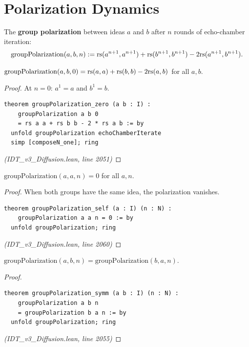 \section{Polarization Dynamics}

\begin{definition}
\label{def:group-polarization}
The \textbf{group polarization} between ideas $a$ and $b$ after $n$ rounds
of echo-chamber iteration:
\[
  \mathrm{groupPolarization}(a, b, n) := \mathrm{rs}(a^{n+1}, a^{n+1}) + \mathrm{rs}(b^{n+1}, b^{n+1}) - 2\mathrm{rs}(a^{n+1}, b^{n+1}).
\]
\end{definition}

\begin{theorem}
\label{thm:polarization-zero}
$\mathrm{groupPolarization}(a, b, 0) = \mathrm{rs}(a, a) + \mathrm{rs}(b, b) - 2\mathrm{rs}(a, b)$
for all $a, b$.
\end{theorem}

\begin{proof}
At $n = 0$: $a^1 = a$ and $b^1 = b$.
\begin{lstlisting}
theorem groupPolarization_zero (a b : I) :
    groupPolarization a b 0
    = rs a a + rs b b - 2 * rs a b := by
  unfold groupPolarization echoChamberIterate
  simp [composeN_one]; ring
\end{lstlisting}
\textit{(IDT\_v3\_Diffusion.lean, line 2051)}
\end{proof}

\begin{theorem}
\label{thm:polarization-self}
$\mathrm{groupPolarization}(a, a, n) = 0$ for all $a, n$.
\end{theorem}

\begin{proof}
When both groups have the same idea, the polarization vanishes.
\begin{lstlisting}
theorem groupPolarization_self (a : I) (n : N) :
    groupPolarization a a n = 0 := by
  unfold groupPolarization; ring
\end{lstlisting}
\textit{(IDT\_v3\_Diffusion.lean, line 2060)}
\end{proof}

\begin{theorem}
\label{thm:polarization-symm}
$\mathrm{groupPolarization}(a, b, n) = \mathrm{groupPolarization}(b, a, n)$.
\end{theorem}

\begin{proof}
\begin{lstlisting}
theorem groupPolarization_symm (a b : I) (n : N) :
    groupPolarization a b n
    = groupPolarization b a n := by
  unfold groupPolarization; ring
\end{lstlisting}
\textit{(IDT\_v3\_Diffusion.lean, line 2055)}
\end{proof}

